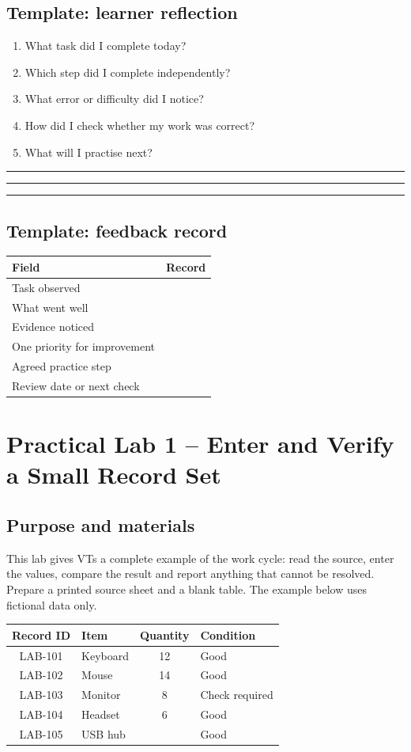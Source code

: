 \documentclass[11pt,openany,oneside]{book}
\begin{document}
\section{Template: learner reflection}
\begin{enumerate}
\item What task did I complete today?
\item Which step did I complete independently?
\item What error or difficulty did I notice?
\item How did I check whether my work was correct?
\item What will I practise next?
\end{enumerate}
\vspace{4mm}\rule{\textwidth}{.4pt}\vspace{18mm}\rule{\textwidth}{.4pt}\vspace{18mm}\rule{\textwidth}{.4pt}
\section{Template: feedback record}
\begin{longtable}{p{}p{}}
\toprule\textbf{Field} & \textbf{Record}\\\midrule
Task observed & \\ [12mm]\hline
What went well & \\ [15mm]\hline
Evidence noticed & \\ [15mm]\hline
One priority for improvement & \\ [15mm]\hline
Agreed practice step & \\ [15mm]\hline
Review date or next check & \\ [12mm]\hline
\end{longtable}

\chapter{Practical Lab 1 -- Enter and Verify a Small Record Set}
\section{Purpose and materials}
This lab gives VTs a complete example of the work cycle: read the source, enter the values, compare the result and report anything that cannot be resolved. Prepare a printed source sheet and a blank table. The example below uses fictional data only.
\begin{center}\small\begin{tabularx}{.92\textwidth}{|c|X|c|X|}\hline
\textbf{Record ID} & \textbf{Item} & \textbf{Quantity} & \textbf{Condition}\\\hline
LAB-101 & Keyboard & 12 & Good\\\hline
LAB-102 & Mouse & 14 & Good\\\hline
LAB-103 & Monitor & 8 & Check required\\\hline
LAB-104 & Headset & 6 & Good\\\hline
LAB-105 & USB hub &  & Good\\\hline
\end{tabularx}\end{center}
\end{document}
